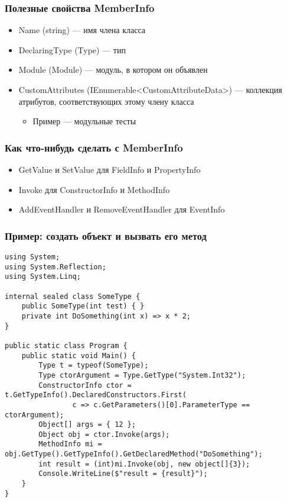 \documentclass[xetex,mathserif,serif]{beamer}
\begin{document}
	\begin{frame}
		\frametitle{Полезные свойства MemberInfo}
		\begin{itemize}
			\item Name (string) --- имя члена класса
			\item DeclaringType (Type) --- тип
			\item Module (Module) --- модуль, в котором он объявлен
			\item CustomAttributes (IEnumerable<CustomAttributeData>) --- коллекция атрибутов, соответствующих этому члену класса
			\begin{itemize}
				\item Пример --- модульные тесты
			\end{itemize}
		\end{itemize}
	\end{frame}

	\begin{frame}
		\frametitle{Как что-нибудь сделать с MemberInfo}
		\begin{itemize}
			\item GetValue и SetValue для FieldInfo и PropertyInfo
			\item Invoke для ConstructorInfo и MethodInfo
			\item AddEventHandler и RemoveEventHandler для EventInfo
		\end{itemize}
	\end{frame}

	\begin{frame}[fragile]
		\frametitle{Пример: создать объект и вызвать его метод}
		\begin{scriptsize}
			\begin{verbatim}
using System;
using System.Reflection;
using System.Linq;

internal sealed class SomeType {
    public SomeType(int test) { }
    private int DoSomething(int x) => x * 2;
}

public static class Program {
    public static void Main() {
        Type t = typeof(SomeType);
        Type ctorArgument = Type.GetType("System.Int32");
        ConstructorInfo ctor = t.GetTypeInfo().DeclaredConstructors.First(
                c => c.GetParameters()[0].ParameterType == ctorArgument);
        Object[] args = { 12 };
        Object obj = ctor.Invoke(args);
        MethodInfo mi = obj.GetType().GetTypeInfo().GetDeclaredMethod("DoSomething");
        int result = (int)mi.Invoke(obj, new object[]{3});
        Console.WriteLine($"result = {result}");
    }
}
			\end{verbatim}
		\end{scriptsize}
	\end{frame}
\end{document}
